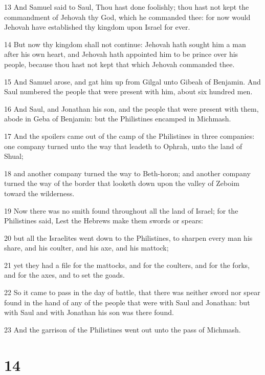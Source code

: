 \par 13 And Samuel said to Saul, Thou hast done foolishly; thou hast not kept the commandment of Jehovah thy God, which he commanded thee: for now would Jehovah have established thy kingdom upon Israel for ever.
\par 14 But now thy kingdom shall not continue: Jehovah hath sought him a man after his own heart, and Jehovah hath appointed him to be prince over his people, because thou hast not kept that which Jehovah commanded thee.
\par 15 And Samuel arose, and gat him up from Gilgal unto Gibeah of Benjamin. And Saul numbered the people that were present with him, about six hundred men.
\par 16 And Saul, and Jonathan his son, and the people that were present with them, abode in Geba of Benjamin: but the Philistines encamped in Michmash.
\par 17 And the spoilers came out of the camp of the Philistines in three companies: one company turned unto the way that leadeth to Ophrah, unto the land of Shual;
\par 18 and another company turned the way to Beth-horon; and another company turned the way of the border that looketh down upon the valley of Zeboim toward the wilderness.
\par 19 Now there was no smith found throughout all the land of Israel; for the Philistines said, Lest the Hebrews make them swords or spears:
\par 20 but all the Israelites went down to the Philistines, to sharpen every man his share, and his coulter, and his axe, and his mattock;
\par 21 yet they had a file for the mattocks, and for the coulters, and for the forks, and for the axes, and to set the goads.
\par 22 So it came to pass in the day of battle, that there was neither sword nor spear found in the hand of any of the people that were with Saul and Jonathan: but with Saul and with Jonathan his son was there found.
\par 23 And the garrison of the Philistines went out unto the pass of Michmash.

\chapter{14}

